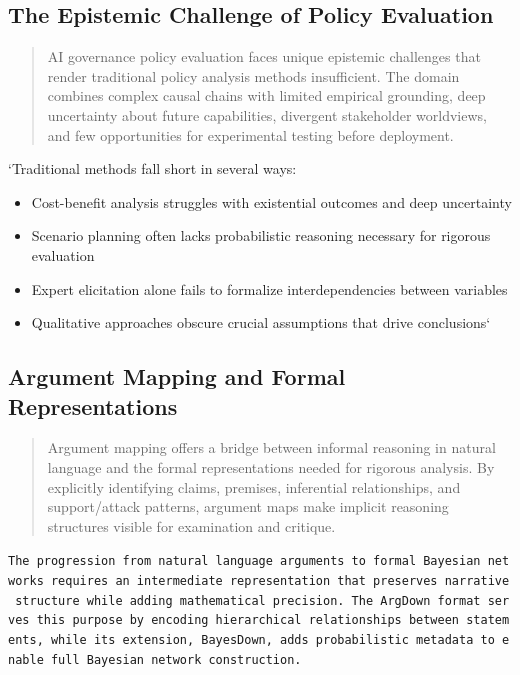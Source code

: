 \documentclass[12pt,a4paper]{report}
\providecommand{\tightlist}{%
  \setlength{\itemsep}{0pt}\setlength{\parskip}{0pt}}
\begin{document}
\subsection{The Epistemic Challenge of Policy
Evaluation}\label{sec-epistemic-challenge}

\begin{quote}
AI governance policy evaluation faces unique epistemic challenges that
render traditional policy analysis methods insufficient. The domain
combines complex causal chains with limited empirical grounding, deep
uncertainty about future capabilities, divergent stakeholder worldviews,
and few opportunities for experimental testing before deployment.
\end{quote}

`Traditional methods fall short in several ways:

\begin{itemize}
\tightlist
\item
  Cost-benefit analysis struggles with existential outcomes and deep
  uncertainty
\item
  Scenario planning often lacks probabilistic reasoning necessary for
  rigorous evaluation
\item
  Expert elicitation alone fails to formalize interdependencies between
  variables
\item
  Qualitative approaches obscure crucial assumptions that drive
  conclusions`
\end{itemize}

\subsection{Argument Mapping and Formal
Representations}\label{sec-argument-mapping}

\begin{quote}
Argument mapping offers a bridge between informal reasoning in natural
language and the formal representations needed for rigorous analysis. By
explicitly identifying claims, premises, inferential relationships, and
support/attack patterns, argument maps make implicit reasoning
structures visible for examination and critique.
\end{quote}

\texttt{The\ progression\ from\ natural\ language\ arguments\ to\ formal\ Bayesian\ networks\ requires\ an\ intermediate\ representation\ that\ preserves\ narrative\ structure\ while\ adding\ mathematical\ precision.\ The\ ArgDown\ format\ serves\ this\ purpose\ by\ encoding\ hierarchical\ relationships\ between\ statements,\ while\ its\ extension,\ BayesDown,\ adds\ probabilistic\ metadata\ to\ enable\ full\ Bayesian\ network\ construction.}
\end{document}
